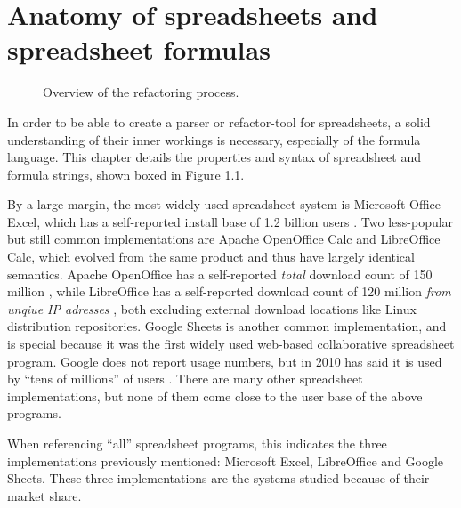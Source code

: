 
\chapter{Anatomy of spreadsheets and spreadsheet formulas}
\label{chapter:anatomy}

\noindent
\begin{figure}[h]
\centerfloat

\caption{Overview of the refactoring process.}
\label{fig:chapteranatomyintrofigure}
\end{figure}


In order to be able to create a parser or refactor-tool for spreadsheets, a solid understanding of their inner workings is necessary, especially of the formula language.
This chapter details the properties and syntax of spreadsheet and formula strings, shown boxed in Figure \ref{fig:chapteranatomyintrofigure}.

By a large margin, the most widely used spreadsheet system is Microsoft Office Excel, which has a self-reported install base of 1.2 billion users \cite{microsoftByTheNumbers}.
Two less-popular but still common implementations are Apache OpenOffice Calc and LibreOffice Calc, which evolved from the same product and thus have largely identical semantics.
Apache OpenOffice has a self-reported \emph{total} download count of 150 million \cite{aoodownloadcount}, while LibreOffice has a self-reported download count of 120 million \emph{from unqiue IP adresses} \cite{libreofficedownloadcount}, both excluding external download locations like Linux distribution repositories.
Google Sheets is another common implementation, and is special because it was the first widely used web-based collaborative spreadsheet program.
Google does not report usage numbers, but in 2010 has said it is used by ``tens of millions'' of users \cite{googlsheetscount}.
There are many other spreadsheet implementations, but none of them come close to the user base of the above programs.

When referencing ``all'' spreadsheet programs, this indicates the three implementations previously mentioned: Microsoft Excel, LibreOffice and Google Sheets.
These three implementations are the systems studied because of their market share.

\newpage

